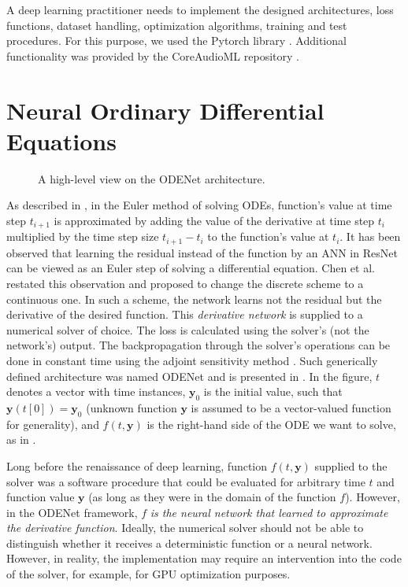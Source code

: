 A deep learning practitioner needs to implement the designed architectures, loss functions, dataset handling, optimization algorithms, training and test procedures. For this purpose, we used the Pytorch library \cite{Pytorch}. Additional functionality was provided by the CoreAudioML repository \cite{CoreAudioML}.

\section{Neural Ordinary Differential Equations}
\label{sec:neural_odes}

\begin{figure}
    \centering
    
    \caption{A high-level view on the ODENet architecture.}
    \label{fig:odenet_architecture}
\end{figure}

As described in , in the Euler method of solving \acp{ODE}, function's value at time step $t_{i+1}$ is approximated by adding the value of the derivative at time step $t_{i}$ multiplied by the time step size $t_{i+1} - t_i$ to the function's value at $t_i$.
It has been observed that learning the residual instead of the function by an \ac{ANN} in \ac{ResNet} can be viewed as an Euler step of solving a differential equation. Chen et al. \cite{Chen2018} restated this observation
and proposed to change the discrete scheme to a continuous one. In such a scheme, the network learns not the residual but the derivative of the desired function. This \emph{derivative network} is supplied to a numerical solver of choice. The loss is calculated using the solver's (not the network's) output. The backpropagation through the solver's operations can be done in constant time using the adjoint sensitivity method \cite{Chen2018}. Such generically defined architecture was named ODENet and is presented in . In the figure, $t$ denotes a vector with time instances, $\pmb{y}_0$ is the initial value, such that $\pmb{y}(t[0]) = \pmb{y}_0$ (unknown function $\pmb{y}$ is assumed to be a vector-valued function for generality), and $f(t, \pmb{y})$ is the right-hand side of the \ac{ODE} we want to solve, as in .

Long before the renaissance of deep learning, function $f(t, \pmb{y})$ supplied to the solver was a software procedure that could be evaluated for arbitrary time $t$ and function value $\pmb{y}$ (as long as they were in the domain of the function $f$). However, in the ODENet framework, $f$ \emph{is the neural network that learned to approximate the derivative function}. Ideally, the numerical solver should not be able to distinguish whether it receives a deterministic function or a neural network. However, in reality, the implementation may require an intervention into the code of the solver, for example, for \ac{GPU} optimization purposes.

